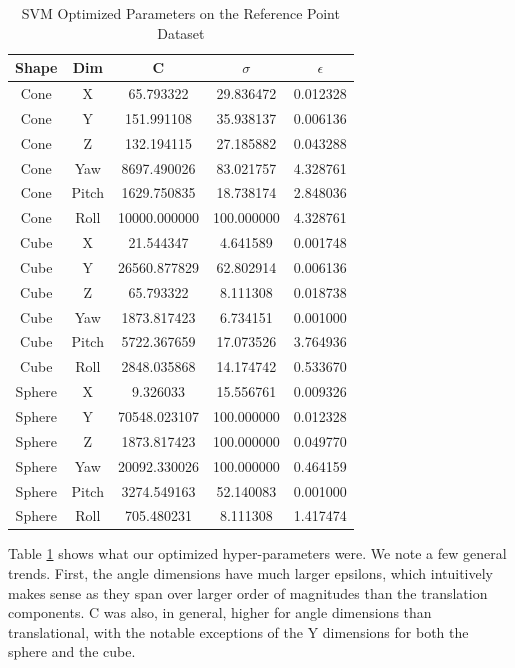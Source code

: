 \documentclass[journal]{IEEEtran}
\begin{document}
\begin{table}[h]
\caption{SVM Optimized Parameters on the Reference Point Dataset}
\label{SVM_Point_Parms}
\centering

\begin{tabular}{|c|c|c|c|c|}
\hline
Shape & Dim & C & $\sigma$ & $\epsilon$\\
\hline
Cone & X & 65.793322 & 29.836472 & 0.012328\\
Cone & Y & 151.991108 & 35.938137 & 0.006136\\
Cone & Z & 132.194115 & 27.185882 & 0.043288\\
Cone & Yaw & 8697.490026 & 83.021757 & 4.328761\\
Cone & Pitch & 1629.750835 & 18.738174 & 2.848036\\
Cone & Roll & 10000.000000 & 100.000000 & 4.328761\\
\hline
Cube & X & 21.544347 & 4.641589 & 0.001748\\
Cube & Y & 26560.877829 & 62.802914 & 0.006136\\
Cube & Z & 65.793322 & 8.111308 & 0.018738\\
Cube & Yaw & 1873.817423 & 6.734151 & 0.001000\\
Cube & Pitch & 5722.367659 & 17.073526 & 3.764936\\
Cube & Roll & 2848.035868 & 14.174742 & 0.533670\\
\hline
Sphere &  X & 9.326033 & 15.556761 & 0.009326\\
Sphere &  Y & 70548.023107 & 100.000000 & 0.012328\\
Sphere &  Z & 1873.817423 & 100.000000 & 0.049770\\
Sphere &  Yaw & 20092.330026 & 100.000000 & 0.464159\\
Sphere &  Pitch & 3274.549163 & 52.140083 & 0.001000\\
Sphere &  Roll & 705.480231 & 8.111308 & 1.417474\\
\hline
\end{tabular}
\end{table}

Table \ref{SVM_Point_Parms} shows what our optimized hyper-parameters were. We note a few general trends. First, the angle dimensions have much larger epsilons, which intuitively makes sense as they span over larger order of magnitudes than the translation components. C was also, in general, higher for angle dimensions than translational, with the notable exceptions of the Y dimensions for both the sphere and the cube.
\end{document}
